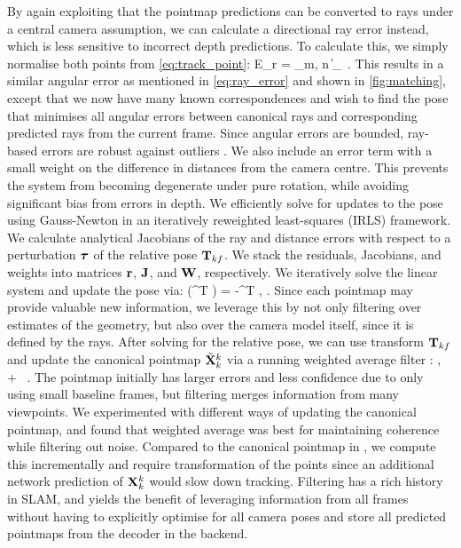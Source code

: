 \documentclass[10pt,twocolumn,letterpaper]{article}
\begin{document}
By again exploiting that the pointmap predictions can be converted to rays under a central camera assumption,
we can calculate a directional ray error instead, which is less sensitive to incorrect depth predictions. To calculate this, we simply normalise both points from \cref{eq:track_point}:
\beq
E_r = \sum_{{m, n} \in {}}\left\|\right\|_{\rho}~. \label{eq:track_ray}
\eeq
This results in a similar angular error as mentioned in \cref{eq:ray_error} and shown in \cref{fig:matching}, except that we now have many known correspondences and wish to find the pose that minimises all angular errors between canonical rays and corresponding predicted rays from the current frame.  Since angular errors are bounded, ray-based errors are robust against outliers \cite{pan2024glomap}.  We also include an error term with a small weight on the difference in distances from the camera centre.
This prevents the system from becoming degenerate under pure rotation, while avoiding significant bias from errors in depth.  We efficiently solve for updates to the pose using Gauss-Newton in an iteratively reweighted least-squares (IRLS) framework.  We calculate analytical Jacobians of the ray and distance errors with respect to a perturbation ${\boldsymbol {\tau}}$ of the relative pose ${{\mathbf T}}_{kf}$.
We stack the residuals, Jacobians, and weights into matrices $\mathbf{r}$, $\mathbf{J}$, and $\mathbf{W}$, respectively. We iteratively solve the linear system and update the pose via:
\beq
    \left(\J^T  \J\right) \vectau =  -\J^T  , \quad
\Tkf \leftarrow \vectau \oplus \Tkf.
    \label{eq:gauss_newton}
\eeq
Since each pointmap may provide valuable new information, we leverage this by not only filtering over estimates of the geometry, but also over the camera model itself, since it is defined by the rays.  After solving for the relative pose, we can use transform ${{\mathbf T}}_{kf}$ and update the canonical pointmap $\tilde{{{\mathbf X}}}^k_{k}$ via a running weighted average filter \cite{curless_tsdf_1996, newcombe_kinectfusion_2011}:
\beq
\Xcanonkk \leftarrow \frac{\Ccanonkk \Xcanonkk +  \Ckf \left(\Tkf \Xkf\right)}{ \Ccanonkk + \Ckf},
\Ccanonkk \leftarrow \Ccanonkk + \Ckf~.
\eeq
The pointmap initially has larger errors and less confidence due to only using small baseline frames, but filtering merges information from many viewpoints.  We experimented with different ways of updating the canonical pointmap, and found that weighted average was best for maintaining coherence while filtering out noise.  Compared to the canonical pointmap in \mastersfm \cite{duisterhof_2024_mast3rsfm}, we compute this incrementally and require transformation of the points since an additional network prediction of ${{\mathbf X}}^k_k$ would slow down tracking.  Filtering has a rich history in SLAM, and yields the benefit of leveraging information from all frames without having to explicitly optimise for all camera poses and store all predicted pointmaps from the decoder in the backend.
\end{document}
